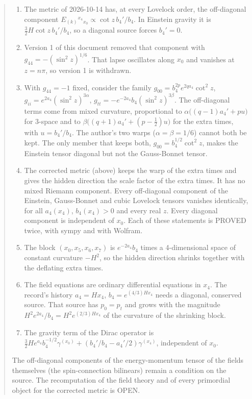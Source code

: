 \documentclass[11pt]{article}
\begin{document}
\begin{abstract}
\begin{enumerate}
\item The metric of 2026-10-14 has, at every Lovelock order, the off-diagonal component $E_{(k)}{}^{x_4}{}_{x_0} \propto \cot z\,b_4'/b_4$. In Einstein gravity it is $\frac32 H\cot z\,b_4'/b_4$, so a diagonal source forces $b_4' = 0$.
\item Version 1 of this document removed that component with $g_{44} = -(\sin^2 z)^{1/6}$. That lapse oscillates along $x_0$ and vanishes at $z = n\pi$, so version 1 is withdrawn.
\item With $g_{44} = -1$ fixed, consider the family $g_{00} = b_4^{2p}e^{2qa_4}\cot^2 z$, $g_{ii} = e^{2a_4}(\sin^2 z)^{3\alpha}$, $g_{tt} = -e^{-2a_4}b_4(\sin^2 z)^{3\beta}$. The off-diagonal terms come from mixed curvature, proportional to $\alpha\big((q-1)a_4' + pu\big)$ for 3-space and to $\beta\big((q+1)a_4' + (p-\frac12)u\big)$ for the extra times, with $u = b_4'/b_4$. The author's two warps ($\alpha = \beta = 1/6$) cannot both be kept. The only member that keeps both, $g_{00} = b_4^{1/2}\cot^2 z$, makes the Einstein tensor diagonal but not the Gauss-Bonnet tensor.
\item The corrected metric (above) keeps the warp of the extra times and gives the hidden direction the scale factor of the extra times. It has no mixed Riemann component. Every off-diagonal component of the Einstein, Gauss-Bonnet and cubic Lovelock tensors vanishes identically, for all $a_4(x_4)$, $b_4(x_4) > 0$ and every real $z$. Every diagonal component is independent of $x_0$. Each of these statements is PROVED twice, with sympy and with Wolfram.
\item The block $(x_0, x_5, x_6, x_7)$ is $e^{-2a_4}b_4$ times a 4-dimensional space of constant curvature $-H^2$, so the hidden direction shrinks together with the deflating extra times.
\item The field equations are ordinary differential equations in $x_4$. The record's history $a_4 = Hx_4$, $b_4 = e^{(4/3)Hx_4}$ needs a diagonal, conserved source. That source has $p_0 = p_t$ and grows with the magnitude $H^2e^{2a_4}/b_4 = H^2e^{(2/3)Hx_4}$ of the curvature of the shrinking block.
\item The gravity term of the Dirac operator is $\frac32 He^{a_4}b_4^{-1/2}\gamma^{(x_0)} + (b_4'/b_4 - a_4'/2)\gamma^{(x_4)}$, independent of $x_0$.
\end{enumerate}

The off-diagonal components of the energy-momentum tensor of the fields themselves (the spin-connection bilinears) remain a condition on the source. The recomputation of the field theory and of every primordial object for the corrected metric is OPEN.

\end{abstract}
\end{document}
